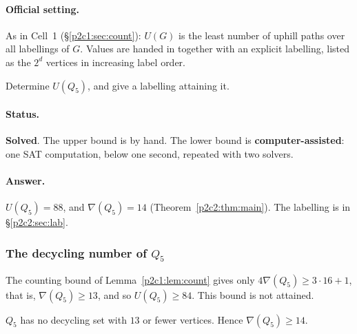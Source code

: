 
\paragraph{Official setting.} As in Cell~1 (\S\ref{p2c1:sec:count}): $U(G)$ is the least number
of uphill paths over all labellings of $G$. Values are handed in together with an explicit
labelling, listed as the $2^d$ vertices in increasing label order.

\begin{statement}
Determine $U(Q_5)$, and give a labelling attaining it.
\end{statement}

\paragraph{Status.} \textbf{Solved}. The upper bound is by hand. The lower bound is
\textbf{computer-assisted}: one SAT computation, below one second, repeated with two solvers.

\paragraph{Answer.} $U(Q_5)=88$, and $\nabla(Q_5)=14$ (Theorem~\ref{p2c2:thm:main}).
The labelling is in \S\ref{p2c2:sec:lab}.

\subsubsection{The decycling number of $Q_5$}

The counting bound of Lemma~\ref{p2c1:lem:count} gives only $4\nabla(Q_5)\ge3\cdot16+1$, that is,
$\nabla(Q_5)\ge13$, and so $U(Q_5)\ge84$. This bound is not attained.

\begin{lemma}\label{p2c2:lem:L5}
$Q_5$ has no decycling set with $13$ or fewer vertices. Hence $\nabla(Q_5)\ge14$.
\end{lemma}

